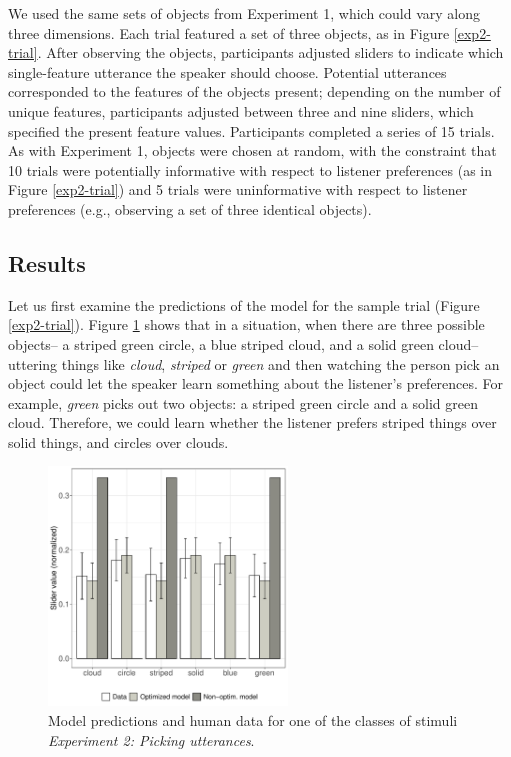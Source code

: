 \documentclass[10pt,a4paper]{article}
\begin{document}
We used the same sets of objects from Experiment 1, which could vary along three dimensions. Each trial featured a set of three objects, as in Figure \ref{exp2-trial}. After observing the objects, participants adjusted sliders to indicate which single-feature utterance the speaker should choose. Potential utterances corresponded to the features of the objects present; depending on the number of unique features, participants adjusted between three and nine sliders, which specified the present feature values. Participants completed a series of 15 trials. As with Experiment 1, objects were chosen at random, with the constraint that 10 trials were potentially informative with respect to listener preferences (as in Figure \ref{exp2-trial}) and 5 trials were uninformative with respect to listener preferences (e.g., observing a set of three identical objects).



\subsection{Results}

Let us first examine the predictions of the model for the sample trial (Figure \ref{exp2-trial}). Figure \ref{barplot_x3} shows that in a situation, when there are three possible objects-- a  striped green circle, a blue striped cloud, and a solid green  cloud--uttering things like \textit{cloud}, \textit{striped} or \textit{green} and then watching the person pick an object could let the speaker learn something about the listener's preferences. For example, \textit{green} picks out two objects: a striped green circle and a solid green cloud. Therefore, we could learn whether the listener prefers striped things over solid things, and circles over clouds.

\begin{figure}[ht!]
	\centering
	\includegraphics[width=2.5in]{images/barplot_x3.pdf}
	\caption{Model predictions and human data for one of the classes of stimuli \emph{Experiment 2: Picking utterances}.}\label{barplot_x3}
\end{figure}
\end{document}
